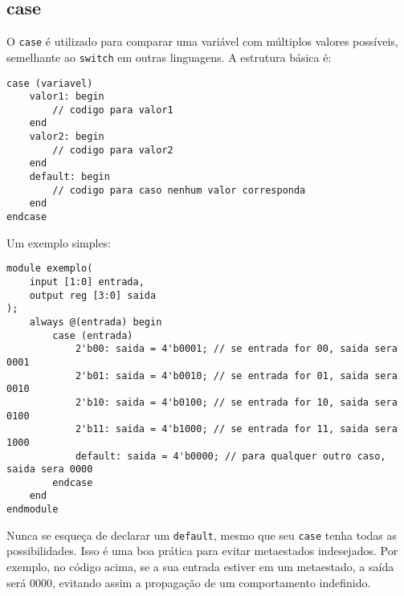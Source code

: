 \documentclass{article}
\begin{document}
\subsection*{case}

O \texttt{case} é utilizado para comparar uma variável com múltiplos valores possíveis, semelhante ao \texttt{switch} em outras linguagens. A estrutura básica é:

\begin{lstlisting}
case (variavel)
    valor1: begin
        // codigo para valor1
    end
    valor2: begin
        // codigo para valor2
    end
    default: begin
        // codigo para caso nenhum valor corresponda
    end
endcase
\end{lstlisting}

Um exemplo simples:

\begin{lstlisting}
module exemplo(
    input [1:0] entrada,
    output reg [3:0] saida
);
    always @(entrada) begin
        case (entrada)
            2'b00: saida = 4'b0001; // se entrada for 00, saida sera 0001
            2'b01: saida = 4'b0010; // se entrada for 01, saida sera 0010
            2'b10: saida = 4'b0100; // se entrada for 10, saida sera 0100
            2'b11: saida = 4'b1000; // se entrada for 11, saida sera 1000
            default: saida = 4'b0000; // para qualquer outro caso, saida sera 0000
        endcase
    end
endmodule
\end{lstlisting}

Nunca se esqueça de declarar um \texttt{default}, mesmo que seu \texttt{case} tenha todas as possibilidades. Isso é uma boa prática para evitar metaestados indesejados. Por exemplo, no código acima, se a sua entrada estiver em um metaestado, a saída será 0000, evitando assim a propagação de um comportamento indefinido.
\end{document}
